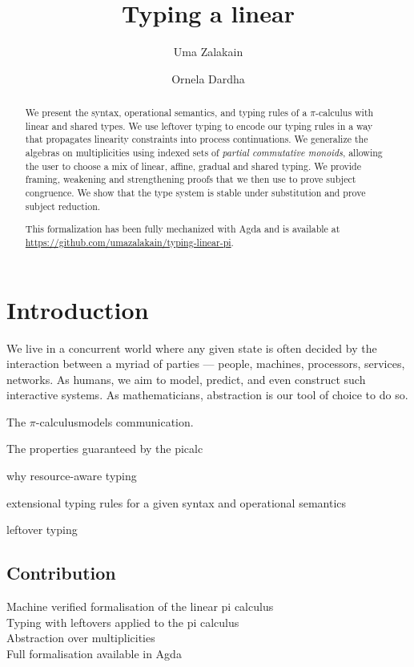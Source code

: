 \documentclass[a4paper,UKenglish,cleveref, autoref, thm-restate,authorcolumns]{lipics-v2019}
\title{Typing a linear \picalc}
\author{Uma Zalakain}{University of Glasgow, Scotland}
       {u.zalakain.1@research.gla.ac.uk}{https://orcid.org/0000-0002-3268-9338}{}
\author{Ornela Dardha}{University of Glasgow, Scotland}
       {ornela.dardha@glasgow.ac.uk}{https://orcid.org/0000-0001-9927-7875}{}
\newcommand{\picalc}{$\pi$-calculus}
\begin{document}
\maketitle
{}

\begin{abstract}
  We present the syntax, operational semantics, and typing rules of a \picalc{} with linear and shared types.
  We use leftover typing \cite{Allais2018a} to encode our typing rules in a way that propagates linearity constraints into process continuations.
  We generalize the algebras on multiplicities using indexed sets of \emph{partial commutative monoids}, allowing the user to choose a mix of linear, affine, gradual and shared typing.
  We provide framing, weakening and strengthening proofs that we then use to prove subject congruence.
  We show that the type system is stable under substitution and prove subject reduction.

  This formalization has been fully mechanized with Agda and is available at \url{https://github.com/umazalakain/typing-linear-pi}.
\end{abstract}

\section{Introduction}

We live in a concurrent world where any given state is often decided by the interaction between a myriad of parties --- people, machines, processors, services, networks.
As humans, we aim to model, predict, and even construct such interactive systems.
As mathematicians, abstraction is our tool of choice to do so.

The \picalc models communication.

The properties guaranteed by the picalc

why resource-aware typing

extensional typing rules for a given syntax and operational semantics

leftover typing

\subsection{Contribution}

\begin{description}
  \item [Machine verified formalisation of the linear pi calculus]

  \item [Typing with leftovers applied to the pi calculus]

  \item [Abstraction over multiplicities]

  \item [Full formalisation available in Agda]
\end{description}
\end{document}
